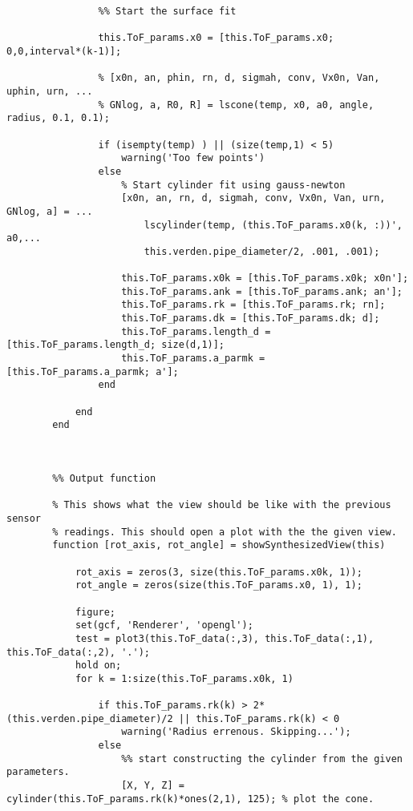 \begin{lstlisting}
                %% Start the surface fit
                
                this.ToF_params.x0 = [this.ToF_params.x0; 0,0,interval*(k-1)];
                
                % [x0n, an, phin, rn, d, sigmah, conv, Vx0n, Van, uphin, urn, ...
                % GNlog, a, R0, R] = lscone(temp, x0, a0, angle, radius, 0.1, 0.1);
                
                if (isempty(temp) ) || (size(temp,1) < 5)
                    warning('Too few points')
                else
                    % Start cylinder fit using gauss-newton
                    [x0n, an, rn, d, sigmah, conv, Vx0n, Van, urn, GNlog, a] = ...
                        lscylinder(temp, (this.ToF_params.x0(k, :))', a0,...
                        this.verden.pipe_diameter/2, .001, .001);
                    
                    this.ToF_params.x0k = [this.ToF_params.x0k; x0n'];
                    this.ToF_params.ank = [this.ToF_params.ank; an'];
                    this.ToF_params.rk = [this.ToF_params.rk; rn];
                    this.ToF_params.dk = [this.ToF_params.dk; d];
                    this.ToF_params.length_d = [this.ToF_params.length_d; size(d,1)];
                    this.ToF_params.a_parmk = [this.ToF_params.a_parmk; a'];
                end
                
            end
        end
        
        
        
        %% Output function
        
        % This shows what the view should be like with the previous sensor
        % readings. This should open a plot with the the given view.
        function [rot_axis, rot_angle] = showSynthesizedView(this)
            
            rot_axis = zeros(3, size(this.ToF_params.x0k, 1));
            rot_angle = zeros(size(this.ToF_params.x0, 1), 1);
            
            figure;
            set(gcf, 'Renderer', 'opengl');
            test = plot3(this.ToF_data(:,3), this.ToF_data(:,1), this.ToF_data(:,2), '.');
            hold on;
            for k = 1:size(this.ToF_params.x0k, 1)
                
                if this.ToF_params.rk(k) > 2*(this.verden.pipe_diameter)/2 || this.ToF_params.rk(k) < 0
                    warning('Radius errenous. Skipping...');
                else
                    %% start constructing the cylinder from the given parameters.
                    [X, Y, Z] = cylinder(this.ToF_params.rk(k)*ones(2,1), 125); % plot the cone.
                    

\end{lstlisting}
